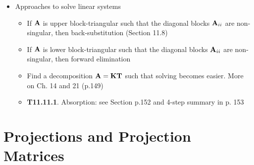 \documentclass[a4paper, oneside]{book}
\begin{document}
\begin{itemize}
\begin{itemize}
	\end{itemize}
\item Approaches to solve linear systems
	\begin{itemize}
	\item If $\mathbf{A}$ is upper block-triangular such that the diagonal blocks $\mathbf{A}_{ii}$ are non-singular, then back-substitution (Section 11.8)
	\item If $\mathbf{A}$ is lower block-triangular such that the diagonal blocks $\mathbf{A}_{ii}$ are non-singular, then forward elimination
	\item Find a decomposition $\mathbf{A=KT}$ such that solving becomes easier. More on Ch. 14 and 21 (p.149)
	\item \textbf{T11.11.1}. Absorption: see Section p.152 and 4-step summary in p. 153
	\end{itemize}
\end{itemize}






















\chapter{Projections and Projection Matrices}
\end{document}

